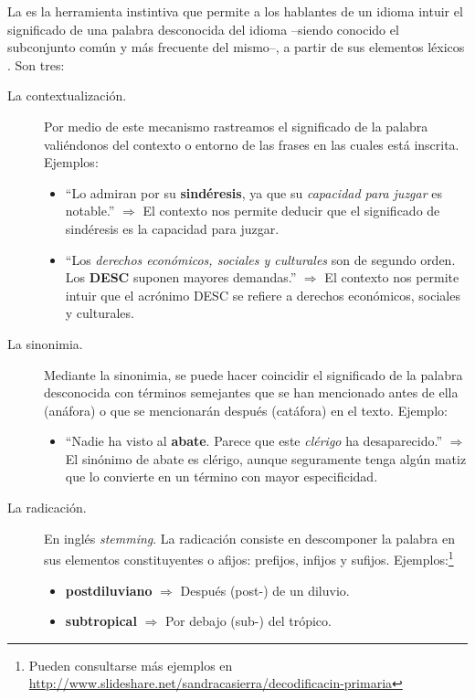 La  es la herramienta instintiva que permite a los hablantes de un idioma intuir el significado de una palabra desconocida del idioma --siendo conocido el subconjunto común y más frecuente del mismo--, a partir de sus elementos léxicos \citep{Zubira2002}. Son tres:
\nopagebreak
\begin{description}
\item[La contextualización.] Por medio de este mecanismo rastreamos el significado de la palabra valiéndonos del contexto o entorno de las frases en las cuales está inscrita. Ejemplos:
\nopagebreak
\begin{itemize}
\item ``Lo admiran por su \textbf{sindéresis}, ya que su \emph{capacidad para juzgar} es notable.'' $\Longrightarrow$ El contexto nos permite deducir que el significado de sindéresis es la capacidad para juzgar.
\item ``Los \emph{derechos económicos, sociales y culturales} son de segundo orden. Los \textbf{DESC} suponen mayores demandas.'' $\Longrightarrow$ El contexto nos permite intuir que el acrónimo DESC se refiere a derechos económicos, sociales y culturales.
\end{itemize}
%
\item[La sinonimia.] Mediante la sinonimia, se puede hacer coincidir el significado de la palabra desconocida con términos semejantes que se han mencionado antes de ella (anáfora) o que se mencionarán después (catáfora) en el texto. Ejemplo:
\nopagebreak
\begin{itemize}
\item ``Nadie ha visto al \textbf{abate}. Parece que este \emph{clérigo} ha desaparecido.'' $\Longrightarrow$ El sinónimo de abate es clérigo, aunque seguramente tenga algún matiz que lo convierte en un término con mayor especificidad.
\end{itemize}
%
\item[La radicación.] En inglés \emph{stemming}. La radicación consiste en descomponer la palabra en sus elementos constituyentes o afijos: prefijos, infijos y sufijos. Ejemplos:\footnote{Pueden consultarse más ejemplos en \url{http://www.slideshare.net/sandracasierra/decodificacin-primaria}}
\nopagebreak
\begin{itemize}
\item \textbf{postdiluviano} $\Longrightarrow$ Después (post-) de un diluvio.
\item \textbf{subtropical}  $\Longrightarrow$ Por debajo (sub-) del trópico.
\end{itemize}
\end{description}

